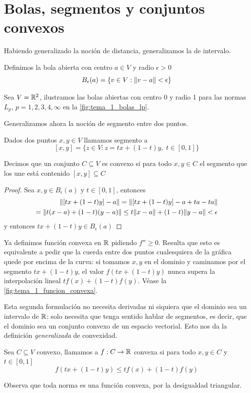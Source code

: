 \section{Bolas, segmentos y conjuntos convexos}
Habiendo generalizado la noción de distancia, generalizamos la de intervalo.
\begin{definition}
  Definimos la bola abierta con centro $a\in V$ y radio $\epsilon>0$ \[
      B_\epsilon (a)=\{v\in V : \lVert v-a\rVert<\epsilon\} 
  \]
\end{definition}
\begin{example}
  Sea $V=\mathbb{R}^2$, ilustramos las bolas abiertas con centro 0 y radio 1 para las normas $L_p$, $p=1,2,3,4,\infty$ en la \cref{fig:tema_1_bolas_lp}.
\end{example}

Generalizamos ahora la noción de segmento entre dos puntos.
\begin{definition}[Segmento]
  Dados dos puntos $x,y\in V$ llamamos segmento a \[
    [x,y]=\{z\in V : z=tx+(1-t)y, \;  t\in[0,1]\} 
  \] 
\end{definition}
\begin{definition}
  Decimos que un conjunto $C\subseteq V$ es convexo si para todo $x,y\in C$ el segmento que los une está contenido $[x,y]\subseteq  C$ 
\end{definition}
\begin{lemma}
\end{lemma}
 \begin{proof}
   Sea $x,y\in B_\epsilon (a)$ y $t\in[0,1]$, entonces
   \begin{align*}
     \lVert[tx+(1-t)y]-a\rVert=\lVert[tx+(1-t)y]-a+ta-ta\rVert\\
     =\lVert t(x-a)+(1-t)(y-a)\rVert\leq t\lVert x-a\rVert+(1-t)\lVert y-a\rVert<\epsilon
   \end{align*}
   y entonces $tx+(1-t)y\in B_\epsilon(a)$ 
 \end{proof}
\begin{informal}
  Ya definimos función convexa en $\mathbb{R}$ pidiendo $f''\geq 0$. Resulta que esto es equivalente a pedir que la cuerda entre dos puntos cualesquiera de la gráfica quede por encima de la curva: si tomamos $x,y$ en el dominio y caminamos por el segmento $tx+(1-t)y$, el valor $f(tx+(1-t)y)$ nunca supera la interpolación lineal $tf(x)+(1-t)f(y)$. Véase la \cref{fig:tema_1_funcion_convexa}.

  Esta segunda formulación no necesita derivadas ni siquiera que el dominio sea un intervalo de $\mathbb{R}$: solo necesita que tenga sentido hablar de segmentos, es decir, que el dominio sea un conjunto convexo de un espacio vectorial. Esto nos da la definición \emph{generalizada} de convexidad.
\end{informal}

\begin{definition}
  Sea $C\subseteq V$ convexo, llamamos a $f: C\to \mathbb{R}$ convexa si para todo $x,y\in C$ y $t\in [0,1]$ \[
    f(tx+(1-t)y)\leq tf(x)+ (1-t)f(y)
  \]
\end{definition}
Observa que toda norma es una función convexa, por la desigualdad triangular.

